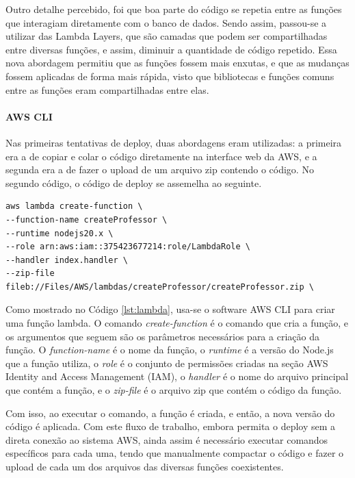 Outro detalhe percebido, foi que boa parte do código se repetia entre as funções que interagiam diretamente com o banco de dados. Sendo assim, passou-se a utilizar das Lambda Layers, que são camadas que podem ser compartilhadas entre diversas funções, e assim, diminuir a quantidade de código repetido. Essa nova abordagem permitiu que as funções fossem mais enxutas, e que as mudanças fossem aplicadas de forma mais rápida, visto que bibliotecas e funções comuns entre as funções eram compartilhadas entre elas.

\paragraph*{AWS CLI}

Nas primeiras tentativas de deploy, duas abordagens eram utilizadas: a primeira era a de copiar e colar o código diretamente na interface web da AWS, e a segunda era a de fazer o upload de um arquivo zip contendo o código. No segundo código, o código de deploy se assemelha ao seguinte.

\begin{lstlisting}[caption={Código de deploy de Lambda},label={lst:lambda}]
aws lambda create-function \
--function-name createProfessor \
--runtime nodejs20.x \
--role arn:aws:iam::375423677214:role/LambdaRole \
--handler index.handler \
--zip-file fileb://Files/AWS/lambdas/createProfessor/createProfessor.zip \
\end{lstlisting}

Como mostrado no Código \ref{lst:lambda}, usa-se o software AWS CLI para criar uma função lambda. O comando \textit{create-function} é o comando que cria a função, e os argumentos que seguem são os parâmetros necessários para a criação da função. O \textit{function-name} é o nome da função, o \textit{runtime} é a versão do Node.js que a função utiliza, o \textit{role} é o conjunto de permissões criadas na seção AWS Identity and Access Management (IAM), o \textit{handler} é o nome do arquivo principal que contém a função, e o \textit{zip-file} é o arquivo zip que contém o código da função.

Com isso, ao executar o comando, a função é criada, e então, a nova versão do código é aplicada. Com este fluxo de trabalho, embora permita o deploy sem a direta conexão ao sistema AWS, ainda assim é necessário executar comandos específicos para cada uma, tendo que manualmente compactar o código e fazer o upload de cada um dos arquivos das diversas funções coexistentes.

